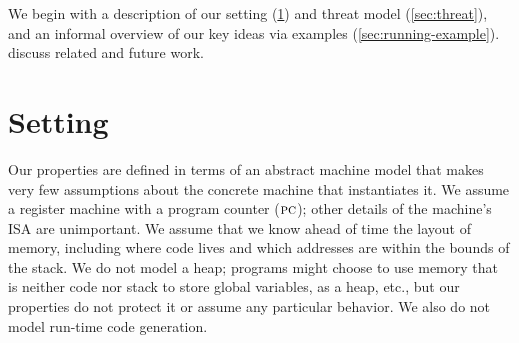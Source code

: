 \documentclass[acmsmall,review,anonymous]{acmart}\settopmatter{printfolios=true,printccs=false,printacmref=false}
\begin{document}
We begin with a description of our setting (\cref{sec:setup}) and threat
model (\cref{sec:threat}), and an informal overview of our key ideas via
examples (\cref{sec:running-example}).  discuss related and future work.

\section{Setting}
\label{sec:setup}

Our properties are defined in terms of an abstract machine model that makes very few
assumptions about the concrete machine that instantiates it.  We assume a register
machine with a program counter (\(\textsc{pc}\)); other
details of the machine's ISA are unimportant. We assume that we know ahead of time
the layout of memory, including where code lives and which addresses are within
the bounds of the stack. We do not model a heap; programs might choose to use memory
that is neither code nor stack to store global variables, as a heap, etc., but our
properties do not protect it or assume any particular behavior. We also do not
model run-time code generation.
\end{document}
